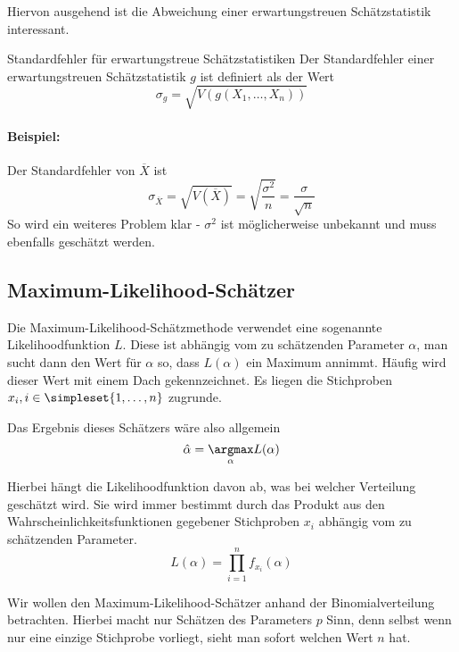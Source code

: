 Hiervon ausgehend ist die Abweichung einer erwartungstreuen Schätzstatistik interessant.
\begin{definition}{Standardfehler für erwartungstreue Schätzstatistiken}
	Der Standardfehler einer erwartungstreuen Schätzstatistik $g$ ist definiert als der Wert%
	\begin{equation*}
		\sigma_g = \sqrt{V(g(X_1,\ldots,X_n))}
	\end{equation*}
\end{definition}
\paragraph{Beispiel:}
Der Standardfehler von $\overline X$ ist
\begin{equation*}
	\sigma_{\overline X} = \sqrt{V(\overline X)}= \sqrt{\frac{\sigma^2}{n}}=\frac\sigma {\sqrt n}
\end{equation*}
So wird ein weiteres Problem klar - $\sigma^2$ ist möglicherweise unbekannt und muss ebenfalls geschätzt werden.



\subsection{Maximum-Likelihood-Schätzer}
Die Maximum-Likelihood-Schätzmethode verwendet eine sogenannte Likelihoodfunktion $L$. Diese ist abhängig vom zu schätzenden Parameter $\alpha$, man sucht dann den Wert für $\alpha$ so, dass $L(\alpha)$ ein Maximum annimmt. Häufig wird dieser Wert mit einem Dach gekennzeichnet. Es liegen die Stichproben $x_i, i\in\simpleset{1,\ldots,n}$ zugrunde.

Das Ergebnis dieses Schätzers wäre also allgemein
\begin{equation*}
	\hat\alpha = \underset\alpha\argmax L(\alpha)
\end{equation*}

Hierbei hängt die Likelihoodfunktion davon ab, was bei welcher Verteilung geschätzt wird. Sie wird immer bestimmt durch das Produkt aus den Wahrscheinlichkeitsfunktionen gegebener Stichproben $x_i$ abhängig vom zu schätzenden Parameter.
\begin{equation*}
	L(\alpha) = \prod_{i=1}^{n} f_{x_i}(\alpha)
\end{equation*}

Wir wollen den Maximum-Likelihood-Schätzer anhand der Binomialverteilung betrachten.
Hierbei macht nur Schätzen des Parameters $p$ Sinn, denn selbst wenn nur eine einzige Stichprobe vorliegt, sieht man sofort welchen Wert $n$ hat.

